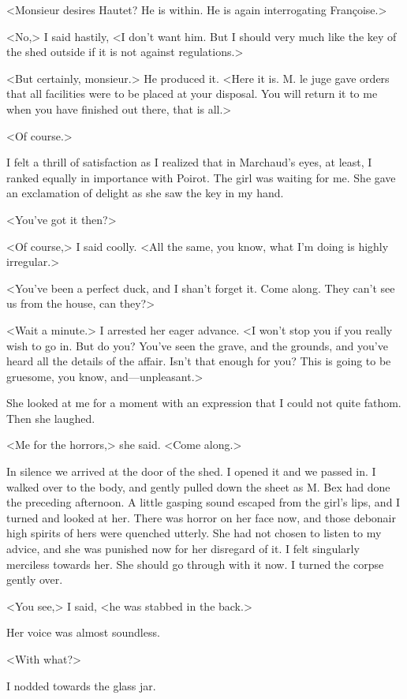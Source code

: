  <Monsieur desires Hautet? He is within. He is again interrogating Françoise.> 

 <No,> I said hastily, <I don't want him. But I should very much like the key of the shed outside if it is not against regulations.> 

 <But certainly, monsieur.> He produced it. <Here it is. M. le juge gave orders that all facilities were to be placed at your disposal. You will return it to me when you have finished out there, that is all.> 

 <Of course.> 

 I felt a thrill of satisfaction as I realized that in Marchaud's eyes, at least, I ranked equally in importance with Poirot. The girl was waiting for me. She gave an exclamation of delight as she saw the key in my hand. 

 <You've got it then?> 

 <Of course,> I said coolly. <All the same, you know, what I'm doing is highly irregular.> 

 <You've been a perfect duck, and I shan't forget it. Come along. They can't see us from the house, can they?> 

 <Wait a minute.> I arrested her eager advance. <I won't stop you if you really wish to go in. But do you? You've seen the grave, and the grounds, and you've heard all the details of the affair. Isn't that enough for you? This is going to be gruesome, you know, and—unpleasant.> 

 She looked at me for a moment with an expression that I could not quite fathom. Then she laughed. 

 <Me for the horrors,> she said. <Come along.> 

 In silence we arrived at the door of the shed. I opened it and we passed in. I walked over to the body, and gently pulled down the sheet as M. Bex had done the preceding afternoon. A little gasping sound escaped from the girl's lips, and I turned and looked at her. There was horror on her face now, and those debonair high spirits of hers were quenched utterly. She had not chosen to listen to my advice, and she was punished now for her disregard of it. I felt singularly merciless towards her. She should go through with it now. I turned the corpse gently over. 

 <You see,> I said, <he was stabbed in the back.> 

 Her voice was almost soundless. 

 <With what?> 

 I nodded towards the glass jar. 


